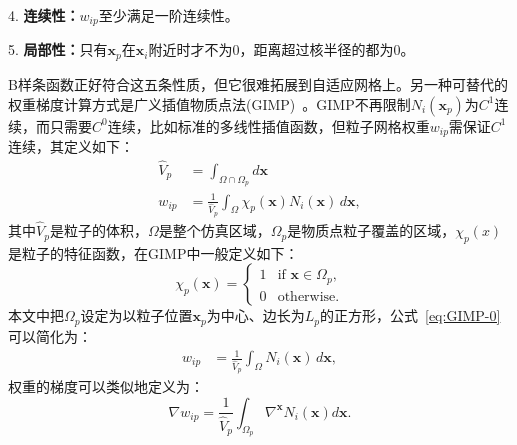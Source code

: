 4. \textbf{连续性：}$w_{ip}$至少满足一阶连续性。

5. \textbf{局部性：}只有$\mathbf{x}_p$在$\mathbf{x}_i$附近时才不为0，距离超过核半径的都为0。

B样条函数正好符合这五条性质，但它很难拓展到自适应网格上。另一种可替代的权重梯度计算方式是广义插值物质点法(GIMP)~\cite{bardenhagen2004generalized}。GIMP不再限制$N_i(\mathbf{x}_p)$为$C^1$连续，而只需要$C^0$连续，比如标准的多线性插值函数，但粒子网格权重$w_{ip}$需保证$C^1$连续，其定义如下：
\begin{equation}
    \begin{aligned}
        \hat{V}_p &= \int_{\Omega\cap\Omega_p} d\mathbf{x} \\
        w_{ip} &= \frac{1}{\hat{V}_p} \int_{\Omega} \chi_p(\mathbf{x}) N_i(\mathbf{x}) \, d\mathbf{x},
    \end{aligned}
    \label{eq:GIMP-0}
\end{equation}
其中$\hat{V}_p$是粒子的体积，$\Omega$是整个仿真区域，$\Omega_p$是物质点粒子覆盖的区域，$\chi_p(x)$是粒子的特征函数，在GIMP中一般定义如下：
\begin{equation}
    \chi_p(\mathbf{x}) = 
\begin{cases}
1 & \text{if } \mathbf{x} \in \Omega_p, \\
0 & \text{otherwise}.
\end{cases}
\end{equation}
本文中把$\Omega_p$设定为以粒子位置$\mathbf{x}_p$为中心、边长为$L_p$的正方形，公式~\ref{eq:GIMP-0}可以简化为：
\begin{equation}
    \begin{aligned}
        w_{ip} &= \frac{1}{\hat{V}_p} \int_{\Omega} N_i(\mathbf{x}) \, d\mathbf{x},
    \end{aligned}
\end{equation}
权重的梯度可以类似地定义为：
\begin{equation}
    \nabla w_{ip} = \frac{1}{\hat{V}_p} \int_{\Omega_p} \nabla^{\mathbf{x}} N_i(\mathbf{x}) d\mathbf{x}.
\end{equation}

